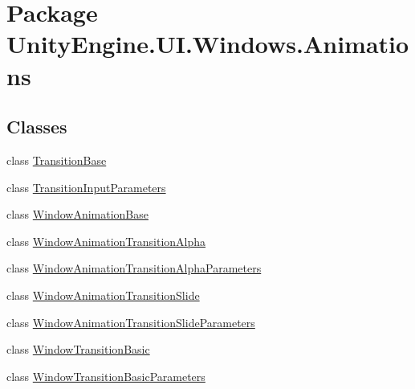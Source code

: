 \hypertarget{namespace_unity_engine_1_1_u_i_1_1_windows_1_1_animations}{}\section{Package Unity\+Engine.\+U\+I.\+Windows.\+Animations}
\label{namespace_unity_engine_1_1_u_i_1_1_windows_1_1_animations}
\subsection*{Classes}
\begin{DoxyCompactItemize}
\item 
class \hyperlink{class_unity_engine_1_1_u_i_1_1_windows_1_1_animations_1_1_transition_base}{Transition\+Base}
\item 
class \hyperlink{class_unity_engine_1_1_u_i_1_1_windows_1_1_animations_1_1_transition_input_parameters}{Transition\+Input\+Parameters}
\item 
class \hyperlink{class_unity_engine_1_1_u_i_1_1_windows_1_1_animations_1_1_window_animation_base}{Window\+Animation\+Base}
\item 
class \hyperlink{class_unity_engine_1_1_u_i_1_1_windows_1_1_animations_1_1_window_animation_transition_alpha}{Window\+Animation\+Transition\+Alpha}
\item 
class \hyperlink{class_unity_engine_1_1_u_i_1_1_windows_1_1_animations_1_1_window_animation_transition_alpha_parameters}{Window\+Animation\+Transition\+Alpha\+Parameters}
\item 
class \hyperlink{class_unity_engine_1_1_u_i_1_1_windows_1_1_animations_1_1_window_animation_transition_slide}{Window\+Animation\+Transition\+Slide}
\item 
class \hyperlink{class_unity_engine_1_1_u_i_1_1_windows_1_1_animations_1_1_window_animation_transition_slide_parameters}{Window\+Animation\+Transition\+Slide\+Parameters}
\item 
class \hyperlink{class_unity_engine_1_1_u_i_1_1_windows_1_1_animations_1_1_window_transition_basic}{Window\+Transition\+Basic}
\item 
class \hyperlink{class_unity_engine_1_1_u_i_1_1_windows_1_1_animations_1_1_window_transition_basic_parameters}{Window\+Transition\+Basic\+Parameters}
\end{DoxyCompactItemize}
